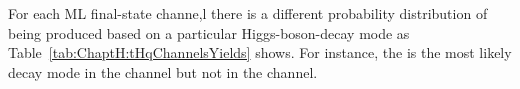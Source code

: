 
For each ML final-state channe,l there is a different probability distribution of being produced based on a particular Higgs-boson-decay mode as
Table~\ref{tab:ChaptH:tHqChannelsYields} shows. For instance, the \Htautau is the most likely decay mode in the
\lepditau channel but not in the \trilep channel. 

